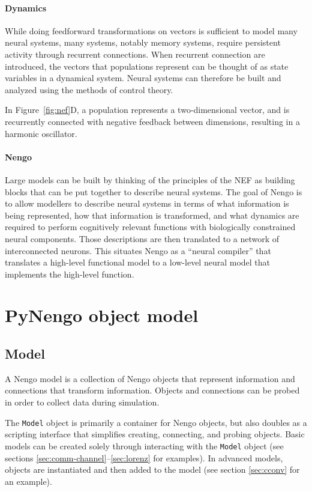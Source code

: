 \documentclass{frontiersSCNS}
\begin{document}
\paragraph{Dynamics}
While doing feedforward transformations
on vectors is sufficient to model
many neural systems,
many systems, notably memory systems,
require persistent activity through recurrent connections.
When recurrent connection are introduced,
the vectors that populations represent
can be thought of as state variables
in a dynamical system.
Neural systems can therefore
be built and analyzed using
the methods of control theory.

In Figure~\ref{fig:nef}D,
a population represents a two-dimensional vector,
and is recurrently connected
with negative feedback between dimensions,
resulting in a harmonic oscillator.

\paragraph{Nengo}
Large models can be built
by thinking of the principles of the NEF
as building blocks that can be put together
to describe neural systems.
The goal of Nengo is to allow
modellers to describe neural systems
in terms of what information is being represented,
how that information is transformed,
and what dynamics are required
to perform cognitively relevant
functions with biologically constrained
neural components.
Those descriptions are then
translated to a network
of interconnected neurons.
This situates Nengo
as a ``neural compiler''
that translates
a high-level functional model
to a low-level neural model
that implements the high-level function.

\section{PyNengo object model}

\subsection{Model}

A Nengo model is a collection
of Nengo objects that represent information
and connections that transform information.
Objects and connections can be probed
in order to collect data during simulation.

The \texttt{Model} object is primarily a container
for Nengo objects,
but also doubles as
a scripting interface
that simplifies creating, connecting,
and probing objects.
Basic models
can be created solely through interacting
with the \texttt{Model} object
(see sections \ref{sec:comm-channel}--\ref{sec:lorenz}
for examples).
In advanced models,
objects are instantiated
and then added to the model
(see section \ref{sec:cconv} for an example).
\end{document}
